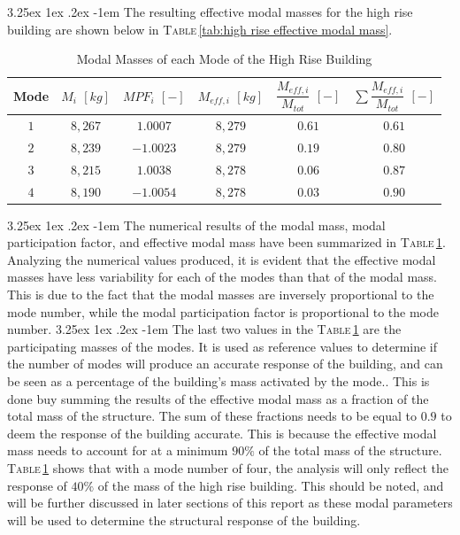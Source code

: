 \documentclass[11pt,a4paper,titlepage]{report}
\makeatletter
\renewcommand\paragraph{\@startsection{paragraph}{5}{\z@}%
  {3.25ex \@plus1ex \@minus.2ex}%
  {-1em}%
  {\normalfont\normalsize\bfseries}}
\makeatother
\begin{document}
\paragraph{}The resulting effective modal masses for the high rise building are shown below in \textsc{Table}\,\ref{tab:high rise effective modal mass}.
\begin{table}[h]
    \centering
    \begin{tabular}{c|c|c|c|c|c}
        Mode & $M_i$ $[kg]$ & $MPF_i$ $[-]$ & $M_{eff,i}$ $[kg]$ & $\dfrac{M_{eff,i}}{M_{tot}}$ $[-]$ & $\sum\dfrac{M_{eff,i}}{M_{tot}}$ $[-]$\\
        \hline
       $1$ & $8,267$ & $1.0007$ & $8,279$ & $0.61$ & $0.61$\\
       $2$ & $8,239$ & $-1.0023$ & $8,279$ & $0.19$ & $0.80$\\
       $3$ & $8,215$ & $1.0038$ & $8,278$ & $0.06$ & $0.87$\\
       $4$ & $8,190$ & $-1.0054$ & $8,278$ & $0.03$ & $0.90$\\
    \end{tabular}
    \caption{Modal Masses of each Mode of the High Rise Building}
    \label{tab:modal properties}
\end{table}
\paragraph{}The numerical results of the modal mass, modal participation factor, and effective modal mass have been summarized in \textsc{Table}\,\ref{tab:modal properties}. Analyzing the numerical values produced, it is evident that the effective modal masses have less variability for each of the modes than that of the modal mass. This is due to the fact that the modal masses are inversely proportional to the mode number, while the modal participation factor is proportional to the mode number. 
\paragraph{}The last two values in the \textsc{Table}\,\ref{tab:modal properties} are the participating masses of the modes. It is used as reference values to determine if the number of modes will produce an accurate response of the building, and can be seen as a percentage of the building's mass activated by the mode.. This is done buy summing the results of the effective modal mass as a fraction of the total mass of the structure. The sum of these fractions needs to be equal to $0.9$ to deem the response of the building accurate. This is because the effective modal mass needs to account for at a minimum $90\%$ of the total mass of the structure. \textsc{Table}\,\ref{tab:modal properties} shows that with a mode number of four, the analysis will only reflect the response of $40\%$ of the mass of the high rise building. This should be noted, and will be further discussed in later sections of this report as these modal parameters will be used to determine the structural response of the building.
\end{document}
